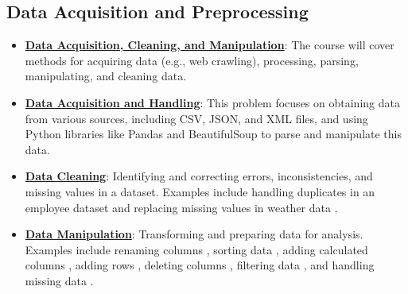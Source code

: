 \documentclass{article}%
\begin{document}
\subsection{Data Acquisition and Preprocessing}%
\label{subsec:DataAcquisitionandPreprocessing}%
\begin{itemize}[leftmargin=*]%
\item \href{https://purdue.brightspace.com/d2l/common/assets/pdfjs-d2l-dist/1.0.14-legacy/web/viewer.html?file=\%2Fcontent\%2Fenforced\%2F1095465-WL.202510.CS24200.LE1\%2F01L1-introduction.pdf\%3Fou\%3D1095465\&lang=en-us\&container=d2l-fileviewer-rendered-pdf\&fullscreen=d2l-fileviewer-rendered-pdf-dialog\&height=667#page=4}{\textbf{Data Acquisition, Cleaning, and Manipulation}}: The course will cover methods for acquiring data (e.g., web crawling), processing, parsing, manipulating, and cleaning data.%
\item \href{https://purdue.brightspace.com/d2l/common/assets/pdfjs-d2l-dist/1.0.14-legacy/web/viewer.html?file=\%2Fcontent\%2Fenforced\%2F1095465-WL.202510.CS24200.LE1\%2F04L1-data.pdf\%3Fou\%3D1095465\&lang=en-us\&container=d2l-fileviewer-rendered-pdf\&fullscreen=d2l-fileviewer-rendered-pdf-dialog\&height=667#page=5}{\textbf{Data Acquisition and Handling}}: This problem focuses on obtaining data from various sources, including CSV, JSON, and XML files, and using Python libraries like Pandas and BeautifulSoup to parse and manipulate this data.%
\item \href{https://purdue.brightspace.com/d2l/common/assets/pdfjs-d2l-dist/1.0.14-legacy/web/viewer.html?file=\%2Fcontent\%2Fenforced\%2F1095465-WL.202510.CS24200.LE1\%2F06L3-wrangling.pdf\%3Fou\%3D1095465\&lang=en-us\&container=d2l-fileviewer-rendered-pdf\&fullscreen=d2l-fileviewer-rendered-pdf-dialog\&height=667#page=23}{\textbf{Data Cleaning}}: Identifying and correcting errors, inconsistencies, and missing values in a dataset. Examples include handling duplicates in an employee dataset  and replacing missing values in weather data .%
\item \href{https://purdue.brightspace.com/d2l/common/assets/pdfjs-d2l-dist/1.0.14-legacy/web/viewer.html?file=\%2Fcontent\%2Fenforced\%2F1095465-WL.202510.CS24200.LE1\%2F06L3-wrangling.pdf\%3Fou\%3D1095465\&lang=en-us\&container=d2l-fileviewer-rendered-pdf\&fullscreen=d2l-fileviewer-rendered-pdf-dialog\&height=667#page=4}{\textbf{Data Manipulation}}: Transforming and preparing data for analysis. Examples include renaming columns , sorting data , adding calculated columns , adding rows , deleting columns , filtering data , and handling missing data .%

\end{itemize}
\end{document}
